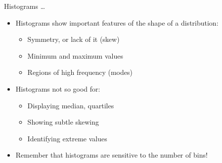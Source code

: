 \documentclass[10pt,handout]{beamer}\usepackage[]{graphicx}\usepackage[]{color}
\begin{document}
		
\begin{frame}{Histograms \dots}
			\protect\hypertarget{histograms-1}{}

\begin{itemize}
\item Histograms show important features of the shape of a distribution:
			
			\begin{itemize}
				\item
				Symmetry, or lack of it (skew)
				\item
				Minimum and maximum values
				\item
				Regions of high frequency (modes)
			\end{itemize}
	\pause		
		\item 	Histograms not so good for:
			
			\begin{itemize}
				\item
				Displaying median, quartiles
				\item
				Showing subtle skewing
				\item
				Identifying extreme values
			\end{itemize}
		
		\pause
		\item Remember that histograms are sensitive to the number of bins!

\end{itemize}			
			
\end{frame}
\end{document}
